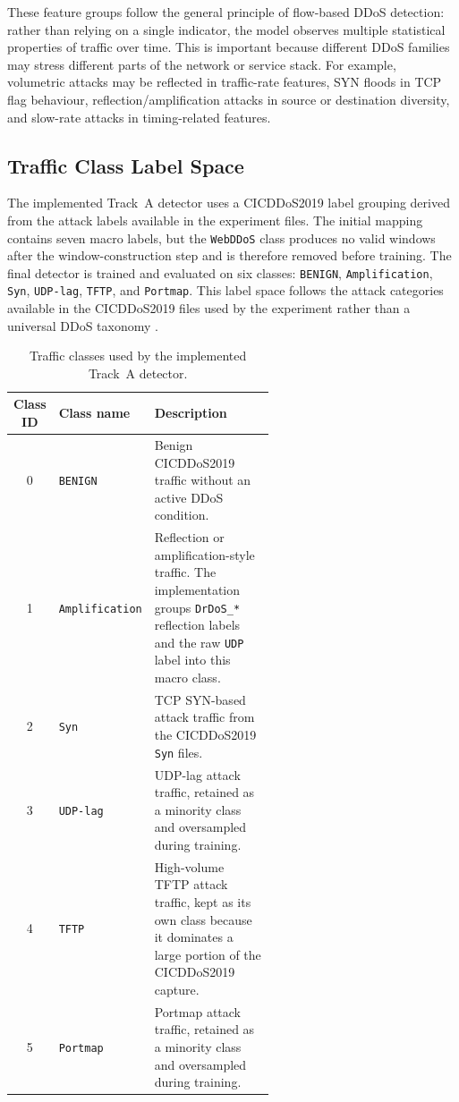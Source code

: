 \documentclass[12pt, a4paper, reqno, oneside]{book}
\begin{document}
These feature groups follow the general principle of flow-based DDoS
detection: rather than relying on a single indicator, the model observes
multiple statistical properties of traffic over time. This is important because
different DDoS families may stress different parts of the network or service
stack. For example, volumetric attacks may be reflected in traffic-rate
features, SYN floods in TCP flag behaviour, reflection/amplification attacks
in source or destination diversity, and slow-rate attacks in timing-related
features.

\subsection{Traffic Class Label Space}
\label{subsec:traffic-label-space}

The implemented Track~A detector uses a CICDDoS2019 label grouping derived
from the attack labels available in the experiment files. The initial mapping
contains seven macro labels, but the
\texttt{WebDDoS} class produces no valid windows after the window-construction
step and is therefore removed before training. The final detector is trained
and evaluated on six classes: \texttt{BENIGN}, \texttt{Amplification},
\texttt{Syn}, \texttt{UDP-lag}, \texttt{TFTP}, and \texttt{Portmap}. This
label space follows the attack categories available in the CICDDoS2019 files
used by the experiment rather than a universal DDoS taxonomy
\cite{sharafaldin2019cicddos}.

\begin{table}[htbp]
\centering
\caption{Traffic classes used by the implemented Track~A detector.}
\label{tab:traffic-classes}
\begin{tabular}{clp{0.58\linewidth}}
\hline
\textbf{Class ID} & \textbf{Class name} & \textbf{Description} \\
\hline
0 & \texttt{BENIGN} &
Benign CICDDoS2019 traffic without an active DDoS condition. \\

1 & \texttt{Amplification} &
Reflection or amplification-style traffic. The implementation groups
\texttt{DrDoS\_*} reflection labels and the raw \texttt{UDP} label into this
macro class. \\

2 & \texttt{Syn} &
TCP SYN-based attack traffic from the CICDDoS2019 \texttt{Syn} files. \\

3 & \texttt{UDP-lag} &
UDP-lag attack traffic, retained as a minority class and oversampled during
training. \\

4 & \texttt{TFTP} &
High-volume TFTP attack traffic, kept as its own class because it dominates a
large portion of the CICDDoS2019 capture. \\

5 & \texttt{Portmap} &
Portmap attack traffic, retained as a minority class and oversampled during
training. \\
\hline
\end{tabular}
\end{table}
\end{document}
